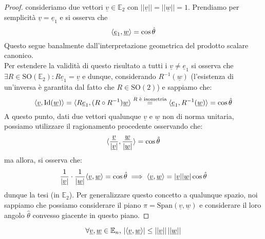 \documentclass[openany, italian]{book}
\begin{document}
\begin{proof}
consideriamo due vettori $\underline{v} \in \mathbb{E}_2$ con $|| \underline{v} || = || \underline{w} || = 1$. Prendiamo per semplicità $\underline{v} = \underline{e}_1$ e si osserva che
$$
\langle \underline{e}_1, \underline{w} \rangle = \cos{\hat{\theta}}
$$
Questo segue banalmente dall'interpretazione geometrica del prodotto scalare canonico. \\
Per estendere la validità di questo risultato a tutti i $\underline{v} \neq \underline{e}_1$ si osserva che $\exists R \in \text{SO}(\mathbb{E}_2): R\underline{e}_1 = \underline{v}$ e dunque, considerando $R^{-1}(\underline{w})$ (l'esistenza di un'inversa è garantita dal fatto che $R \in \text{SO}(2)$) e sappiamo che:
$$
\langle \underline{v}, \text{Id}(\underline{w}) \rangle = \langle R \underline{e}_1, (R \circ R^{-1})\underline{w} \rangle \stackrel{R\text{ è isometria}}{=} \langle \underline{e}_1, R^{-1}(\underline{w}) \rangle =  \cos{\hat{\theta}}
$$
A questo punto, dati due vettori qualunque $\underline{v}$ e $\underline{w}$ non di norma unitaria, possiamo utilizzare il ragionamento procedente osservando che:
$$
\langle \frac{\underline{v}}{|\underline{v}|}, \frac{\underline{w}}{|\underline{w}|} \rangle = \cos{\hat{\theta}}
$$
ma allora, si osserva che:
$$
\frac{1}{|\underline{v}|} \cdot \frac{1}{|\underline{w}|} \langle \underline{v}, \underline{w} \rangle = \cos{\hat{\theta}} \implies \langle \underline{v},  \underline{w} \rangle = |\underline{v}| |\underline{w}| \cos{\hat{\theta}}
$$
dunque la tesi (in $\mathbb{E}_2$). Per generalizzare questo concetto a qualunque spazio, noi sappiamo che possiamo considerare il piano $\pi = \text{Span}(\underline{v}, \underline{w})$ e considerare il loro angolo $\hat{\theta}$ convesso giacente in questo piano.
\end{proof}
\begin{prop}
$$\forall \underline{v}, \underline{w} \in \mathbb{E}_n, \, | \langle \underline{v}, \underline{w} \rangle | \leq ||\underline{v}|| \, ||\underline{w}||$$
\label{prop:dis_cs}
\end{prop}
\end{document}
